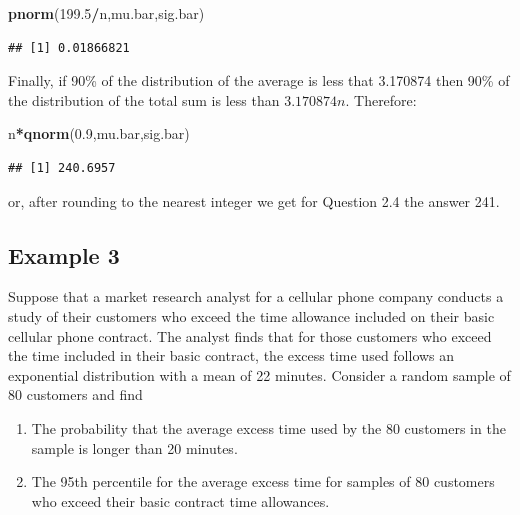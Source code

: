 \documentclass[
]{krantz}
\makeatletter
\newenvironment{Shaded}{\begin{snugshade}}{\end{snugshade}}
\newcommand{\FloatTok}[1]{\textcolor[rgb]{0.00,0.00,0.81}{#1}}
\newcommand{\KeywordTok}[1]{\textcolor[rgb]{0.13,0.29,0.53}{\textbf{#1}}}
\newcommand{\NormalTok}[1]{#1}
\newcommand{\OperatorTok}[1]{\textcolor[rgb]{0.81,0.36,0.00}{\textbf{#1}}}
\newenvironment{kframe}{%
\medskip{}
\setlength{\fboxsep}{.8em}
 \def\at@end@of@kframe{}%
 \ifinner\ifhmode%
  \def\at@end@of@kframe{\end{minipage}}%
  \begin{minipage}{\columnwidth}%
 \fi\fi%
 \def\FrameCommand##1{\hskip\@totalleftmargin \hskip-\fboxsep
 \colorbox{shadecolor}{##1}\hskip-\fboxsep
     \hskip-\linewidth \hskip-\@totalleftmargin \hskip\columnwidth}%
 \MakeFramed {\advance\hsize-\width
   \@totalleftmargin\z@ \linewidth\hsize
   \@setminipage}}%
 {\par\unskip\endMakeFramed%
 \at@end@of@kframe}
\renewenvironment{Shaded}{\begin{kframe}}{\end{kframe}}
\theoremstyle{definition}
\theoremstyle{definition}
\theoremstyle{definition}
\theoremstyle{remark}
\makeatother
\begin{document}
\begin{Shaded}
\begin{Highlighting}[]
\KeywordTok{pnorm}\NormalTok{(}\FloatTok{199.5}\OperatorTok{/}\NormalTok{n,mu.bar,sig.bar)}
\end{Highlighting}
\end{Shaded}

\begin{verbatim}
## [1] 0.01866821
\end{verbatim}

Finally, if 90\% of the distribution of the average is less that 3.170874
then 90\% of the distribution of the total sum is less than \(3.170874 n\).
Therefore:

\begin{Shaded}
\begin{Highlighting}[]
\NormalTok{n}\OperatorTok{*}\KeywordTok{qnorm}\NormalTok{(}\FloatTok{0.9}\NormalTok{,mu.bar,sig.bar)}
\end{Highlighting}
\end{Shaded}

\begin{verbatim}
## [1] 240.6957
\end{verbatim}

or, after rounding to the nearest integer we get for Question 2.4 the
answer 241.

\hypertarget{example-3}{%
\subsection{Example 3}\label{example-3}}

Suppose that a market research analyst for a cellular phone company
conducts a study of their customers who exceed the time allowance
included on their basic cellular phone contract. The analyst finds that
for those customers who exceed the time included in their basic
contract, the excess time used follows an exponential distribution with
a mean of 22 minutes. Consider a random sample of 80 customers and find

\begin{enumerate}
\def\labelenumi{\arabic{enumi}.}
\item
  The probability that the average excess time used by the 80
  customers in the sample is longer than 20 minutes.
\item
  The 95th percentile for the average excess time for samples of 80
  customers who exceed their basic contract time allowances.
\end{enumerate}
\end{document}
